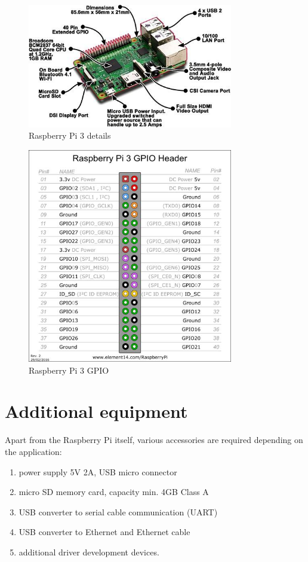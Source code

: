 \documentclass[11pt]{article}
\begin{document}
\begin{figure}
\centering
\includegraphics[width=0.8\textwidth]{rpi-3-details.jpg}
\captionsetup{justification=centering}
\caption{Raspberry Pi 3 details}
\end{figure}
\begin{figure}[h!]
	\centering
	\includegraphics[width=0.8\textwidth]{rpi-3-pins.jpg}
	\captionsetup{justification=centering}
	\caption{Raspberry Pi 3 GPIO}
	\label{fig:rpi-gpio}
\end{figure}

\clearpage
\section{Additional equipment}
Apart from the Raspberry Pi itself, various accessories are required
depending on the application:
\begin{enumerate}
	\item power supply 5V 2A, USB micro connector
	\item micro SD memory card, capacity min. 4GB Class A
	\item USB converter to serial cable communication (UART)
	\item USB converter to Ethernet and Ethernet cable
	\item additional driver development devices.
\end{enumerate}
\end{document}
